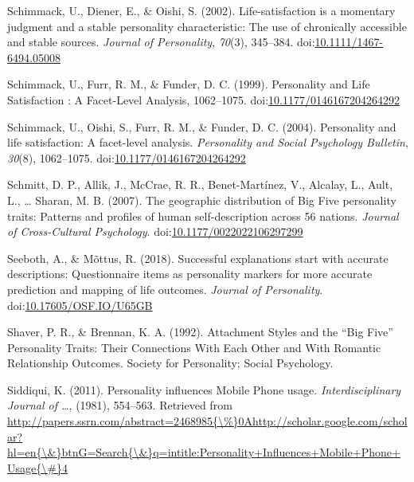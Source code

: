 \documentclass[,man,floatsintext]{apa6}
\begin{document}
\hypertarget{ref-Schimmack2002}{}
Schimmack, U., Diener, E., \& Oishi, S. (2002). Life-satisfaction is a
momentary judgment and a stable personality characteristic: The use of
chronically accessible and stable sources. \emph{Journal of
Personality}, \emph{70}(3), 345--384.
doi:\href{https://doi.org/10.1111/1467-6494.05008}{10.1111/1467-6494.05008}

\hypertarget{ref-Schimmack1999}{}
Schimmack, U., Furr, R. M., \& Funder, D. C. (1999). Personality and
Life Satisfaction : A Facet-Level Analysis, 1062--1075.
doi:\href{https://doi.org/10.1177/0146167204264292}{10.1177/0146167204264292}

\hypertarget{ref-Schimmack2004}{}
Schimmack, U., Oishi, S., Furr, R. M., \& Funder, D. C. (2004).
Personality and life satisfaction: A facet-level analysis.
\emph{Personality and Social Psychology Bulletin}, \emph{30}(8),
1062--1075.
doi:\href{https://doi.org/10.1177/0146167204264292}{10.1177/0146167204264292}

\hypertarget{ref-Schmitt2007}{}
Schmitt, D. P., Allik, J., McCrae, R. R., Benet-Martínez, V., Alcalay,
L., Ault, L., \ldots{} Sharan, M. B. (2007). The geographic distribution
of Big Five personality traits: Patterns and profiles of human
self-description across 56 nations. \emph{Journal of Cross-Cultural
Psychology}.
doi:\href{https://doi.org/10.1177/0022022106297299}{10.1177/0022022106297299}

\hypertarget{ref-Seeboth2018}{}
Seeboth, A., \& Mõttus, R. (2018). Successful explanations start with
accurate descriptions: Questionnaire items as personality markers for
more accurate prediction and mapping of life outcomes. \emph{Journal of
Personality}.
doi:\href{https://doi.org/10.17605/OSF.IO/U65GB}{10.17605/OSF.IO/U65GB}

\hypertarget{ref-Shaver1992}{}
Shaver, P. R., \& Brennan, K. A. (1992). Attachment Styles and the ``Big
Five'' Personality Traits: Their Connections With Each Other and With
Romantic Relationship Outcomes. Society for Personality; Social
Psychology.

\hypertarget{ref-Siddiqui2011}{}
Siddiqui, K. (2011). Personality influences Mobile Phone usage.
\emph{Interdisciplinary Journal of \ldots{}}, (1981), 554--563.
Retrieved from
\href{http://papers.ssrn.com/abstract=2468985\%7B/\%\%7D0Ahttp://scholar.google.com/scholar?hl=en\%7B/\&\%7DbtnG=Search\%7B/\&\%7Dq=intitle:Personality+Influences+Mobile+Phone+Usage\%7B/\#\%7D4}{http://papers.ssrn.com/abstract=2468985\{\textbackslash{}\%\}0Ahttp://scholar.google.com/scholar?hl=en\{\textbackslash{}\&\}btnG=Search\{\textbackslash{}\&\}q=intitle:Personality+Influences+Mobile+Phone+Usage\{\textbackslash{}\#\}4}
\end{document}

